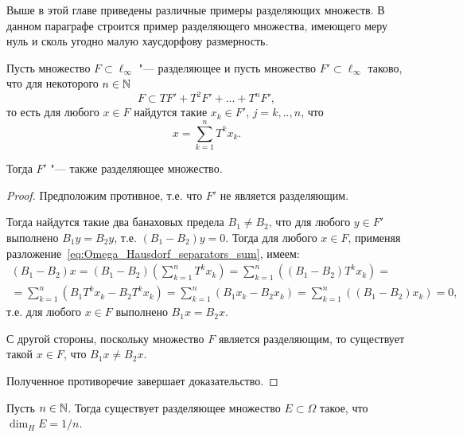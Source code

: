 
Выше в этой главе приведены различные примеры разделяющих множеств.
В данном параграфе строится пример разделяющего множества,
имеющего меру нуль и сколь угодно малую хаусдорфову размерность.

\begin{lemma}
	\label{lem:Omega_Hausdorf_separators_sum}
	Пусть множество $F \subset \ell_\infty$ "--- разделяющее
	и пусть множество $F' \subset \ell_\infty$ таково, что для некоторого $n\in\mathbb{N}$
	\begin{equation}
		F \subset TF' + T^2F' + ... + T^n F'
		,
	\end{equation}
	то есть для любого $x\in F$ найдутся такие $x_k\in F'$, $j=k,..,n$,
	что
	\begin{equation}
		\label{eq:Omega_Hausdorf_separators_sum}
		x = \sum_{k=1}^{n} T^k x_k
		.
	\end{equation}

	Тогда $F'$ "--- также разделяющее множество.
\end{lemma}

\begin{proof}
	Предположим противное, т.е. что $F'$ не является разделяющим.

	Тогда найдутся такие два банаховых предела $B_1\ne B_2$, что для любого
	$y \in F'$ выполнено $B_1y=B_2y$, т.е. $(B_1-B_2)y = 0$.
	Тогда для любого $x\in F$, применяя разложение~\eqref{eq:Omega_Hausdorf_separators_sum}, имеем:
	\begin{multline}
		(B_1 - B_2)x =
		(B_1 - B_2)\left(\sum_{k=1}^{n} T^k x_k\right) =
		\sum_{k=1}^{n}\left( (B_1 - B_2) T^k x_k\right) =
		\\=
		\sum_{k=1}^{n}\left( B_1 T^k x_k - B_2 T^k x_k\right) =
		\sum_{k=1}^{n}\left( B_1 x_k - B_2 x_k\right) =
		\sum_{k=1}^{n}\left( (B_1 - B_2)x_k\right) =
		0
		,
	\end{multline}
	т.е. для любого $x\in F$ выполнено $B_1 x = B_2 x$.

	С другой стороны, поскольку множество $F$ является разделяющим,
	то существует такой $x\in F$, что $B_1 x \ne B_2 x$.

	Полученное противоречие завершает доказательство.
\end{proof}

\begin{theorem}
	\label{thm:Hausdorf_measure_1_n}
	Пусть $n\in\mathbb{N}$.
	Тогда существует разделяющее множество $E\subset\Omega$ такое,
	что $\dim_H E = 1/n$.
\end{theorem}

